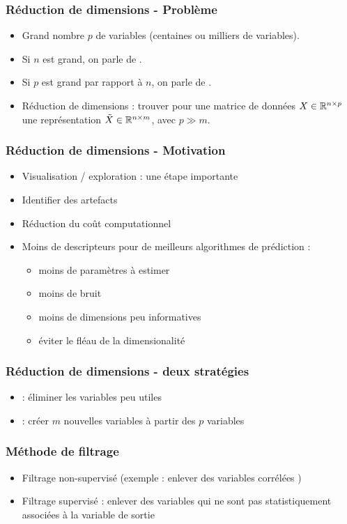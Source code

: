 
\begin{frame}
  \frametitle{Réduction de dimensions - Problème}
  \begin{itemize}
  \item Grand nombre $p$ de variables (centaines ou milliers de variables).
  \item Si $n$ est grand, on parle de .   
  \item Si $p$ est grand par rapport à $n$, on parle de . 
  \item Réduction de dimensions : trouver pour une matrice de données $X\in {\mathbb R}^{n\times p}$ une représentation $\tilde{X} \in {\mathbb R}^{n\times m}$, avec $p\gg m$. 
  \end{itemize}
\end{frame}

\begin{frame}
  \frametitle{Réduction de dimensions - Motivation}
  \begin{itemize}
  \item Visualisation / exploration : une étape importante
  \item Identifier des artefacts
  \item Réduction du coût computationnel
  \item Moins de descripteurs pour de meilleurs algorithmes de prédiction : 
  \begin{itemize}
  	\item moins de paramètres à estimer
  	\item moins de bruit
  	\item moins de dimensions peu informatives
  	\item éviter le fléau de la dimensionalité
  \end{itemize}
  \end{itemize}
\end{frame}

\begin{frame}
  \frametitle{Réduction de dimensions - deux stratégies}
  \begin{itemize}
  	\item {} : éliminer les variables peu utiles
  	\item {} : créer $m$ nouvelles variables à partir des $p$ variables
  \end{itemize}
\end{frame}

\begin{frame}
  \frametitle{Méthode de filtrage}
  \begin{itemize}
  	\item Filtrage non-supervisé (exemple : enlever des variables corrélées )
  	\item Filtrage supervisé : enlever des variables qui ne sont pas statistiquement associées à la variable de sortie
  \end{itemize}
\end{frame}

